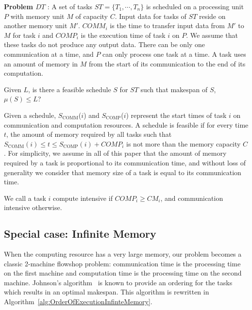 \documentclass[sigconf]{acmart}
\newcommand{\scomm}{\ensuremath{{S}_{\text{COMM}}}}
\newcommand{\scomp}{\ensuremath{{S}_{\text{COMP}}}}
\begin{document}
	\noindent\textbf{Problem $DT$} : A set of tasks $ST=\{T_1,
	\cdots, T_n\}$ is scheduled on a processing unit $P$ with
	memory unit $M$ of capacity $C$. Input data for tasks of $ST$
	reside on another memory unit $M'$. $COMM_i$ is the time to
	transfer input data from $M'$ to $M$ for task $i$ and $COMP_i$
	is the execution time of task $i$ on $P$. We assume that these
	tasks do not produce any output data. There can be only one
	communication at a time, and $P$ can only process one task at
	a time. A task uses an amount of memory in  $M$ from the
	start of its communication to the end of its computation.
	
	\noindent Given $L$, is there a feasible schedule $S$ for $ST$ such that
	makespan of $S$, $\mu(S) \le L$?
	
	
	Given a schedule, \scomm($i$) and \scomp($i$) represent the
	start times of task $i$ on communication and computation
	resources. A schedule is feasible if for every time $t$, the
	amount of memory required by all tasks such that $\scomm(i) \leq t
	\leq \scomp(i) + COMP_i$ is not more than the memory capacity
	$C$. 
	For simplicity, we assume in all of this paper that the
	amount of memory required by a task is proportional to its
	communication time, and without loss of generality we consider
	that memory size of a task is equal to its communication time.
	
	We call a task $i$ compute intensive if $COMP_i \ge CM_i$, and
	communication intensive otherwise.
	
	\subsection{Special case: Infinite Memory}
	
	When the computing resource has a very large memory, our problem
	becomes a classic 2-machine flowshop problem: communication time is
	the processing time on the first machine and computation time is the
	processing time on the second machine. Johnson's
	algorithm~\cite{johnson} is known to provide an ordering for the tasks
	which results in an optimal makespan. This algorithm is rewritten in
	Algorithm~\ref{alg:OrderOfExecutionInfinteMemory}.
	
\end{document}
